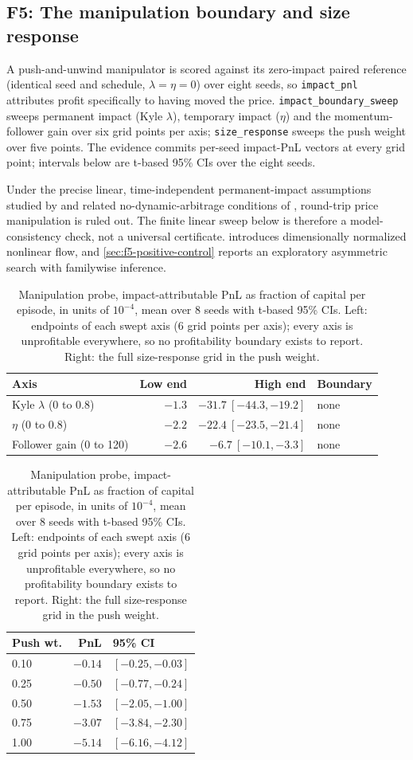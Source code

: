 

\subsection{F5: The manipulation boundary and size response}\label{sec:f5}

A push-and-unwind manipulator is scored against its zero-impact paired reference (identical seed and schedule, $\lambda = \eta = 0$) over eight seeds, so \texttt{impact\_pnl} attributes profit specifically to having moved the price. \texttt{impact\_boundary\_sweep} sweeps permanent impact (Kyle $\lambda$), temporary impact ($\eta$) and the momentum-follower gain over six grid points per axis; \texttt{size\_response} sweeps the push weight over five points. The evidence commits per-seed impact-PnL vectors at every grid point; intervals below are t-based 95\% CIs over the eight seeds.

Under the precise linear, time-independent permanent-impact assumptions studied by \citet{huberman2004price} and related no-dynamic-arbitrage conditions of \citet{gatheral2010no}, round-trip price manipulation is ruled out. The finite linear sweep below is therefore a model-consistency check, not a universal certificate.  introduces dimensionally normalized nonlinear flow, and \cref{sec:f5-positive-control} reports an exploratory asymmetric search with familywise inference.

\begin{table}[t]
\centering
\caption{Manipulation probe, impact-attributable PnL as fraction of capital per episode, in units of $10^{-4}$, mean over 8 seeds with t-based 95\% CIs. Left: endpoints of each swept axis (6 grid points per axis); every axis is unprofitable everywhere, so no profitability boundary exists to report. Right: the full size-response grid in the push weight.}
\label{tab:f5}
\small
\begin{tabular}{lrrl}
\toprule
Axis & Low end & High end & Boundary \\
\midrule
Kyle $\lambda$ (0 to 0.8) & $-1.3$ & $-31.7\ [-44.3, -19.2]$ & none \\
$\eta$ (0 to 0.8) & $-2.2$ & $-22.4\ [-23.5, -21.4]$ & none \\
Follower gain (0 to 120) & $-2.6$ & $-6.7\ [-10.1, -3.3]$ & none \\
\bottomrule
\end{tabular}
\hspace{1.2em}
\begin{tabular}{lrl}
\toprule
Push wt. & PnL & 95\% CI \\
\midrule
0.10 & $-0.14$ & $[-0.25, -0.03]$ \\
0.25 & $-0.50$ & $[-0.77, -0.24]$ \\
0.50 & $-1.53$ & $[-2.05, -1.00]$ \\
0.75 & $-3.07$ & $[-3.84, -2.30]$ \\
1.00 & $-5.14$ & $[-6.16, -4.12]$ \\
\bottomrule
\end{tabular}
\end{table}

